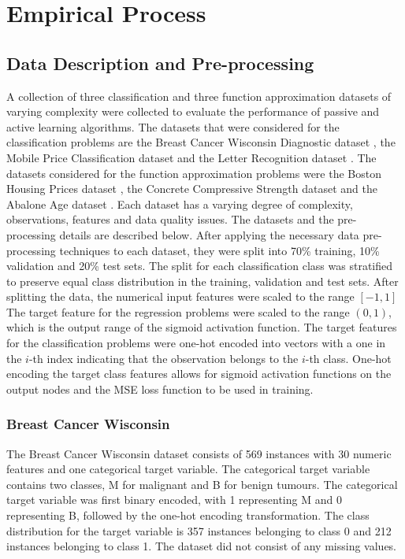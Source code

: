 \documentclass[conference]{IEEEtran}
\begin{document}
	\section{Empirical Process}\label{EP}
	\subsection{Data Description and Pre-processing}
	A collection of three classification and three function approximation datasets of varying complexity were collected to evaluate the performance of passive and active learning algorithms. The datasets that were considered for the classification problems are the Breast Cancer Wisconsin Diagnostic dataset \cite{breast}, the Mobile Price Classification dataset \cite{mobile} and the Letter Recognition dataset \cite{letter}. The datasets considered for the function approximation problems were the Boston Housing Prices dataset \cite{boston}, the Concrete Compressive Strength dataset \cite{concrete} and the Abalone Age dataset \cite{abalone}. Each dataset has a varying degree of complexity, observations, features and data quality issues. The datasets and the pre-processing details are described below. After applying the necessary data pre-processing techniques to each dataset, they were split into 70\% training, 10\% validation and 20\% test sets. The split for each classification class was stratified to preserve equal class distribution in the training, validation and test sets. After splitting the data, the numerical input features were scaled to the range $[-1, 1]$ The target feature for the regression problems were scaled to the range $(0, 1)$, which is the output range of the sigmoid activation function. The target features for the classification problems were one-hot encoded into vectors with a one in the $i$-th index indicating that the observation belongs to the $i$-th class. One-hot encoding the target class features allows for sigmoid activation functions on the output nodes and the MSE loss function to be used in training.
	
	\subsubsection{Breast Cancer Wisconsin}
	The Breast Cancer Wisconsin dataset consists of 569 instances with 30 numeric features and one categorical target variable. The categorical target variable contains two classes, M for malignant and B for benign tumours. The categorical target variable was first binary encoded, with 1 representing M and 0 representing B, followed by the one-hot encoding transformation. The class distribution for the target variable is 357 instances belonging to class 0 and 212 instances belonging to class 1. The dataset did not consist of any missing values.
	
\end{document}
